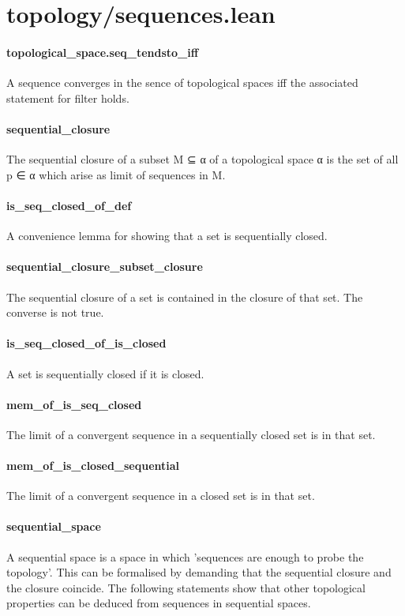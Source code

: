 \documentclass{article}
\begin{document}
\section{topology/sequences.lean}\paragraph{topological\_space.seq\_tendsto\_iff}
\par
A sequence converges in the sence of topological spaces iff the associated statement for filter
holds.
\paragraph{sequential\_closure}
\par
The sequential closure of a subset M ⊆ α of a topological space α is
the set of all p ∈ α which arise as limit of sequences in M.
\paragraph{is\_seq\_closed\_of\_def}
\par
A convenience lemma for showing that a set is sequentially closed.
\paragraph{sequential\_closure\_subset\_closure}
\par
The sequential closure of a set is contained in the closure of that set.
The converse is not true.
\paragraph{is\_seq\_closed\_of\_is\_closed}
\par
A set is sequentially closed if it is closed.
\paragraph{mem\_of\_is\_seq\_closed}
\par
The limit of a convergent sequence in a sequentially closed set is in that set.
\paragraph{mem\_of\_is\_closed\_sequential}
\par
The limit of a convergent sequence in a closed set is in that set.
\paragraph{sequential\_space}
\par
A sequential space is a space in which 'sequences are enough to probe the topology'. This can be
formalised by demanding that the sequential closure and the closure coincide. The following
statements show that other topological properties can be deduced from sequences in sequential
spaces.
\end{document}
